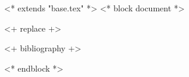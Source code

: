 <* extends "base.tex" *>
<* block document *>
\subjclass[2020]{\docclasses}
\keywords{\dockeywords}



\title[\shorttitlename]{\titlename}
\author{<+ user.name +>}
\address{<+ user.institution +>, <+ user.address +>}

\begin{abstract}
    <+ replace +>
\end{abstract}

\maketitle
\tableofcontents

<+ replace +>

<+ bibliography +>

<* endblock *>
